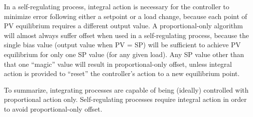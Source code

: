 In a self-regulating process, integral action is necessary for the controller to minimize error following either a setpoint or a load change, because each point of PV equilibrium requires a different output value.  A proportional-only algorithm will almost always suffer offset when used in a self-regulating process, because the single bias value (output value when PV = SP) will be sufficient to achieve PV equilibrium for only one SP value (for any given load).  Any SP value other than that one ``magic'' value will result in proportional-only offset, unless integral action is provided to ``reset'' the controller's action to a new equilibrium point.

To summarize, integrating processes are capable of being (ideally) controlled with proportional action only.  Self-regulating processes require integral action in order to avoid proportional-only offset.











